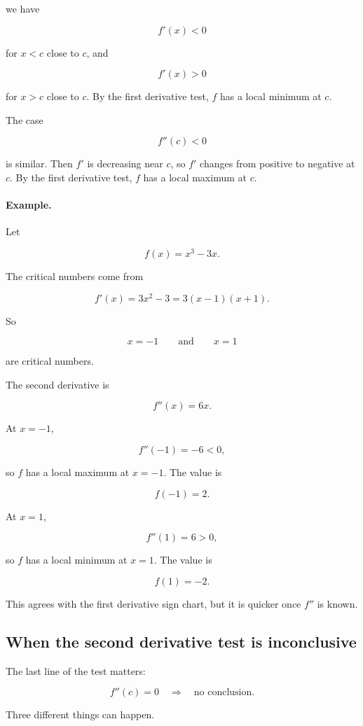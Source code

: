 we have

\[
f'(x)<0
\]

for \(x<c\) close to \(c\), and

\[
f'(x)>0
\]

for \(x>c\) close to \(c\).  By the first derivative test, \(f\) has a local minimum at
\(c\).

The case

\[
f''(c)<0
\]

is similar.  Then \(f'\) is decreasing near \(c\), so \(f'\) changes from positive to
negative at \(c\).  By the first derivative test, \(f\) has a local maximum at \(c\).

\paragraph{Example.}
Let

\[
f(x)=x^3-3x.
\]

The critical numbers come from

\[
f'(x)=3x^2-3=3(x-1)(x+1).
\]

So

\[
x=-1
\qquad\text{and}\qquad
x=1
\]

are critical numbers.

The second derivative is

\[
f''(x)=6x.
\]

At \(x=-1\),

\[
f''(-1)=-6<0,
\]

so \(f\) has a local maximum at \(x=-1\).  The value is

\[
f(-1)=2.
\]

At \(x=1\),

\[
f''(1)=6>0,
\]

so \(f\) has a local minimum at \(x=1\).  The value is

\[
f(1)=-2.
\]

This agrees with the first derivative sign chart, but it is quicker once \(f''\) is known.

\subsection{When the second derivative test is inconclusive}
\label{subsec:second-derivative-test-inconclusive}

The last line of the test matters:

\[
f''(c)=0
\quad\Longrightarrow\quad
\text{no conclusion}.
\]

Three different things can happen.

